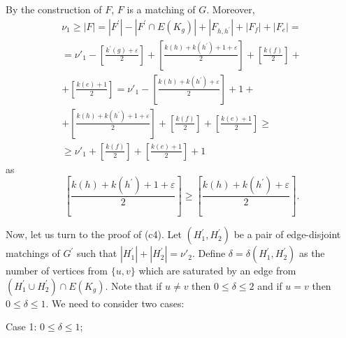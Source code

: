 \documentclass[fleqn,12pt,twoside]{article}
\newenvironment{proof}[1][Proof.]{\begin{trivlist}
\item[\hskip \labelsep {\bfseries #1}]}{\end{trivlist}}
\begin{document}
\begin{proof}
By the construction of $F$, $F$ is a matching of $G$. Moreover,\begin{gather*}
\nu _{1}\geq \left\vert F\right\vert =\left\vert F^{\prime
}\right\vert -\left\vert F^{\prime }\cap E(K_{g})\right\vert
+\left\vert F_{h,h^{\prime
}}\right\vert +\left\vert F_{f}\right\vert +\left\vert F_{e}\right\vert = \\
=\nu' _{1}-\left[ \frac{k^{\prime }(g)+\varepsilon }{2}\right] +\left[ \frac{k(h)+k(h^{\prime })+1+\varepsilon }{2}\right] +\left[ \frac{k(f)}{2}\right] + \\
+\left[ \frac{k(e)+1}{2}\right] =\nu' _{1}-\left[ \frac{k(h)+k(h^{\prime })+\varepsilon }{2}\right] +1+ \\
+\left[ \frac{k(h)+k(h^{\prime })+1+\varepsilon }{2}\right] +\left[ \frac{k(f)}{2}\right] +\left[ \frac{k(e)+1}{2}\right] \geq \\
\geq \nu' _{1}+\left[ \frac{k(f)}{2}\right] +\left[ \frac{k(e)+1}{2}\right] +1
\end{gather*}as\begin{equation*}
\left[ \frac{k(h)+k(h^{\prime })+1+\varepsilon }{2}\right] \geq \left[ \frac{k(h)+k(h^{\prime })+\varepsilon }{2}\right] \text{.}
\end{equation*}

Now, let us turn to the proof of (c4). Let $(H_{1}^{\prime
},H_{2}^{\prime
}) $ be a pair of edge-disjoint matchings of $G^{\prime }$ such that $\left\vert H_{1}^{\prime }\right\vert +\left\vert H_{2}^{\prime
}\right\vert =\nu' _{2}$. Define $\delta =\delta (H_{1}^{\prime
},H_{2}^{\prime })$ as the number of vertices from $\{u,v\}$ which
are saturated by an edge from $(H_{1}^{\prime }\cup H_{2}^{\prime
})\cap E(K_{g})$. Note that if $u\neq v$ then $0\leq \delta \leq 2$
and if $u=v$ then $0\leq \delta \leq 1$. We need to consider two
cases:

Case 1: $0\leq \delta \leq 1$;


\end{proof}
\end{document}
